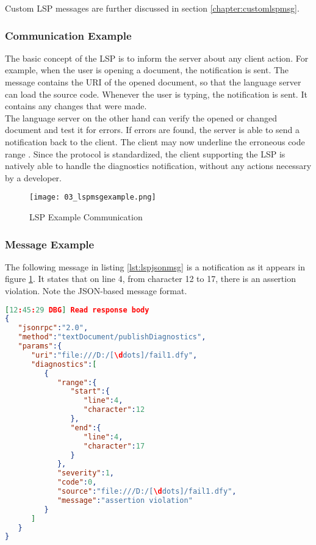 Custom LSP messages are further discussed in section \ref{chapter:customlspmsg}.

\subsubsection{Communication Example}
The basic concept of the LSP is to inform the server about any client action.
For example, when the user is opening a document, the notification  is sent.
The message contains the URI of the opened document, so that the language server can load the source code.
Whenever the user is typing, the notification  is sent.
It contains any changes that were made.\\

The language server on the other hand can verify the opened or changed document and test it for errors.
If errors are found, the server is able to send a  notification back to the client.
The client may now underline the erroneous code range \cite{lspspec}.
Since the protocol is standardized, the client supporting the LSP is natively able to handle the diagnostics notification, without any actions necessary by a developer.

\begin{figure}[H]
    \centering
    \texttt{[image: 03\_lspmsgexample.png]}
    \caption{LSP Example Communication}
    \label{fig:lspmsgexample}
\end{figure}

\subsubsection{Message Example}
The following message in listing \ref{lst:lspjsonmsg} is a  notification as it appears in figure \ref{fig:lspmsgexample}.
It states that on line 4, from character 12 to 17, there is an assertion violation.
Note the JSON-based message format.\\

\begin{lstlisting}[language=json, caption={LSP Message Example}, captionpos=b, label={lst:lspjsonmsg}]
[12:45:29 DBG] Read response body
{
   "jsonrpc":"2.0",
   "method":"textDocument/publishDiagnostics",
   "params":{
      "uri":"file:///D:/[\ddots]/fail1.dfy",
      "diagnostics":[
         {
            "range":{
               "start":{
                  "line":4,
                  "character":12
               },
               "end":{
                  "line":4,
                  "character":17
               }
            },
            "severity":1,
            "code":0,
            "source":"file:///D:/[\ddots]/fail1.dfy",
            "message":"assertion violation"
         }
      ]
   }
}
\end{lstlisting}

